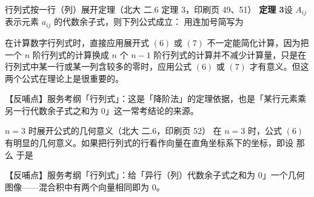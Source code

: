 \begin{fdeep}{行列式按一行（列）展开定理（北大 二.6 定理 3，印刷页 49、51）}
\textbf{定理 3}\quad 设
$A_{ij}$ 表示元素 $a_{ij}$ 的代数余子式，则下列公式成立：
用连加号简写为

在计算数字行列式时，直接应用展开式 $(6)$ 或 $(7)$ 不一定能简化计算，因为把一个 $n$ 阶行列式的计算换成 $n$ 个 $n-1$ 阶行列式的计算并不减少计算量，只是在行列式中某一行或某一列含较多的零时，应用公式 $(6)$ 或 $(7)$ 才有意义。但这两个公式在理论上是很重要的。

【反哺点】服务考纲「行列式」：这是「降阶法」的定理依据，也是「某行元素乘另一行代数余子式之和为 0」这一常考结论的来源。
\end{fdeep}

\begin{fdeep}{$n=3$ 时展开公式的几何意义（北大 二.6，印刷页 52）}
在 $n=3$ 时，公式 $(6)$ 有明显的几何意义。如果把行列式的行看作向量在直角坐标系下的坐标，即设
那么
于是

【反哺点】服务考纲「行列式」：给「异行（列）代数余子式之和为 0」一个几何图像——混合积中有两个向量相同即为 0。
\end{fdeep}

